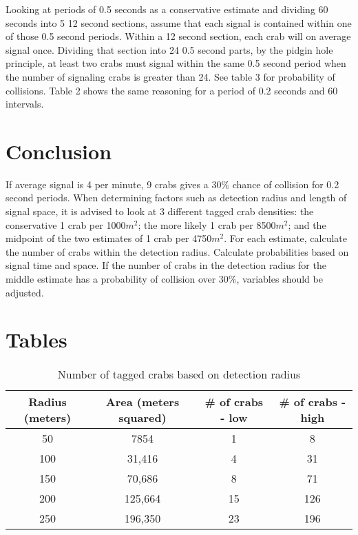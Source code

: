 \documentclass{article}
\begin{document}
Looking at periods of 0.5 seconds as a conservative estimate and dividing 60 seconds into 5 12 second sections, assume that each signal is contained within one of those 0.5 second periods. Within a 12 second section, each crab will on average signal once. Dividing that section into 24 0.5 second parts, by the pidgin hole principle, at least two crabs must signal within the same 0.5 second period when the number of signaling crabs is greater than 24. See table 3 for probability of collisions. Table 2 shows the same reasoning for a period of 0.2 seconds and 60 intervals.

\section{Conclusion}
If average signal is 4 per minute, 9 crabs gives a 30\% chance of collision for 0.2 second periods. When determining factors such as detection radius and length of signal space, it is advised to look at 3 different tagged crab densities: the conservative 1 crab per 1000$m^2$; the more likely 1 crab per 8500$m^2$; and the midpoint of the two estimates of 1 crab per 4750$m^2$. For each estimate, calculate the number of crabs within the detection radius. Calculate probabilities based on signal time and space. If the number of crabs in the detection radius for the middle estimate has a probability of collision over 30\%, variables should be adjusted. 
\newpage
\section{Tables}

\begin{table}[ht]
\centering
\caption{Number of tagged crabs based on detection radius}
\begin{tabular}{|c|c|c|c|}
\hline
\textbf{Radius (meters)} & \textbf{Area (meters squared)} & \textbf{\# of crabs - low} & \textbf{\# of crabs - high} \\ \hline
50                       & 7854                           & 1                          & 8                           \\ \hline
100                      & 31,416                         & 4                          & 31                          \\ \hline
150                      & 70,686                         & 8                          & 71                          \\ \hline
200                      & 125,664                        & 15                         & 126                         \\ \hline
250                      & 196,350                        & 23                         & 196                         \\ \hline
\end{tabular}
\end{table}
\end{document}
